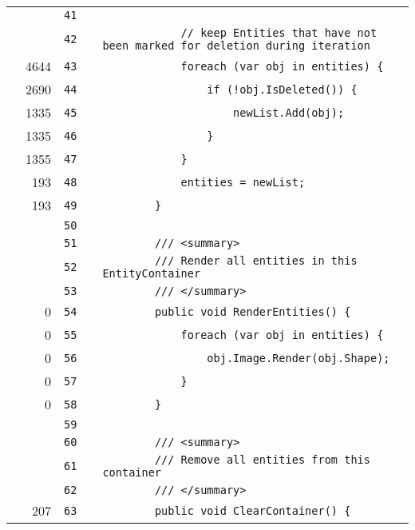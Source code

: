 \documentclass[a4paper,landscape,10pt]{article}
\begin{document}
\begin{longtable}[l]{lrrll}
\cellcolor{gray} &  & \verb~41~ & & \verb~~\\
\cellcolor{gray} &  & \verb~42~ & & \verb~            // keep Entities that have not been marked for deletion during iteration~\\
\cellcolor{green} & 4644 & \verb~43~ & & \verb~            foreach (var obj in entities) {~\\
\cellcolor{green} & 2690 & \verb~44~ & & \verb~                if (!obj.IsDeleted()) {~\\
\cellcolor{green} & 1335 & \verb~45~ & & \verb~                    newList.Add(obj);~\\
\cellcolor{green} & 1335 & \verb~46~ & & \verb~                }~\\
\cellcolor{green} & 1355 & \verb~47~ & & \verb~            }~\\
\cellcolor{green} & 193 & \verb~48~ & & \verb~            entities = newList;~\\
\cellcolor{green} & 193 & \verb~49~ & & \verb~        }~\\
\cellcolor{gray} &  & \verb~50~ & & \verb~~\\
\cellcolor{gray} &  & \verb~51~ & & \verb~        /// <summary>~\\
\cellcolor{gray} &  & \verb~52~ & & \verb~        /// Render all entities in this EntityContainer~\\
\cellcolor{gray} &  & \verb~53~ & & \verb~        /// </summary>~\\
\cellcolor{red} & 0 & \verb~54~ & & \verb~        public void RenderEntities() {~\\
\cellcolor{red} & 0 & \verb~55~ & & \verb~            foreach (var obj in entities) {~\\
\cellcolor{red} & 0 & \verb~56~ & & \verb~                obj.Image.Render(obj.Shape);~\\
\cellcolor{red} & 0 & \verb~57~ & & \verb~            }~\\
\cellcolor{red} & 0 & \verb~58~ & & \verb~        }~\\
\cellcolor{gray} &  & \verb~59~ & & \verb~~\\
\cellcolor{gray} &  & \verb~60~ & & \verb~        /// <summary>~\\
\cellcolor{gray} &  & \verb~61~ & & \verb~        /// Remove all entities from this container~\\
\cellcolor{gray} &  & \verb~62~ & & \verb~        /// </summary>~\\
\cellcolor{green} & 207 & \verb~63~ & & \verb~        public void ClearContainer() {~\\

\end{longtable}
\end{document}
